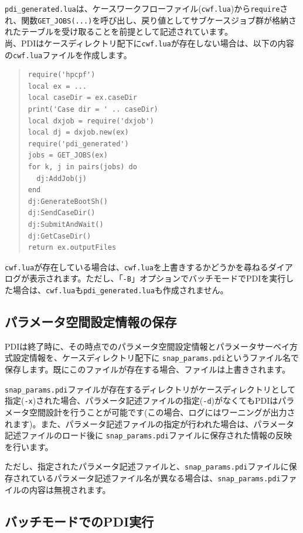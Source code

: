 \documentclass[a4paper,11pt]{jarticle}
\begin{document}
{{\tt pdi\_generated.lua}は、ケースワークフローファイル({\tt cwf.lua})から{\tt require}され、関数{\tt GET\_JOBS(...)}を呼び出し、戻り値としてサブケースジョブ群が格納されたテーブルを受け取ることを前提として記述されています。\\

尚、PDIはケースディレクトリ配下に{\tt cwf.lua}が存在しない場合は、以下の内容の{\tt cwf.lua}ファイルを作成します。

\begin{quote}
\begin{verbatim}
require('hpcpf')
local ex = ...
local caseDir = ex.caseDir
print('Case dir = ' .. caseDir)
local dxjob = require('dxjob')
local dj = dxjob.new(ex)
require('pdi_generated')
jobs = GET_JOBS(ex)
for k, j in pairs(jobs) do
  dj:AddJob(j)
end
dj:GenerateBootSh()
dj:SendCaseDir()
dj:SubmitAndWait()
dj:GetCaseDir()
return ex.outputFiles
\end{verbatim}
\end{quote}

{\tt cwf.lua}が存在している場合は、{\tt cwf.lua}を上書きするかどうかを尋ねるダイアログが表示されます。ただし、「{\tt -B}」オプションでバッチモードでPDIを実行した場合は、{\tt cwf.lua}も{\tt pdi\_generated.lua}も作成されません。\\


\subsection{パラメータ空間設定情報の保存}

PDIは終了時に、その時点でのパラメータ空間設定情報とパラメータサーベイ方式設定情報を、ケースディレクトリ配下に {\tt snap\_params.pdi}というファイル名で保存します。既にこのファイルが存在する場合、ファイルは上書きされます。

{\tt snap\_params.pdi}ファイルが存在するディレクトリがケースディレクトリとして指定({\tt -x})された場合、パラメータ記述ファイルの指定({\tt -d})がなくてもPDIはパラメータ空間設計を行うことが可能です(この場合、ログにはワーニングが出力されます)。また、パラメータ記述ファイルの指定が行われた場合は、パラメータ記述ファイルのロード後に {\tt snap\_params.pdi}ファイルに保存された情報の反映を行います。

ただし、指定されたパラメータ記述ファイルと、{\tt snap\_params.pdi}ファイルに保存されているパラメータ記述ファイル名が異なる場合は、{\tt snap\_params.pdi}ファイルの内容は無視されます。


\subsection{バッチモードでのPDI実行}

}
\end{document}
